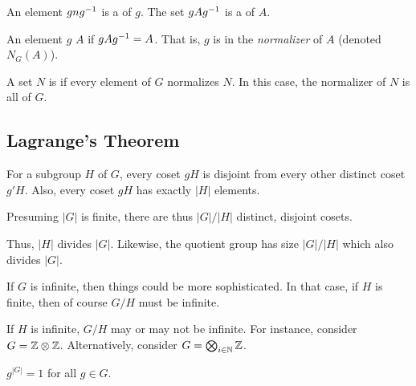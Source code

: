 \begin{definition}
  An element $gn{g}^{-1}$ is a  of $g$. The set
  $gA{g}^{-1}$ is a  of $A$.

  An element $g$  $A$ if $gA{g}^{-1} = A$. That is,
  $g$ is in the \emph{normalizer} of $A$ (denoted $N_G(A)$).

  A set $N$ is  if every element of $G$ normalizes $N$.
  In this case, the normalizer of $N$ is all of $G$.
\end{definition}

\begin{remark}

\end{remark}

\subsection{Lagrange's Theorem}

\begin{theorem}

  For a subgroup $H$ of $G$, every coset $gH$ is disjoint
  from every other distinct coset $g'H$. Also, every coset $gH$ has
  exactly $|H|$ elements.

  Presuming $|G|$ is finite, there are thus $|G|/|H|$ distinct, disjoint
  cosets.

  Thus, $|H|$ divides $|G|$. Likewise, the quotient group has size
  $|G|/|H|$ which also divides $|G|$.
\end{theorem}

\begin{remark}
  If $G$ is infinite, then things could be more sophisticated. In that
  case, if $H$ is finite, then of course $G/H$ must be infinite.

  If $H$ is infinite, $G/H$ may or may not be infinite. For instance,
  consider $G = \mathbb{Z} \otimes \mathbb{Z}$. Alternatively, consider $G =
  \bigotimes_{i \in \mathbb{N}} \mathbb{Z}$.
\end{remark}

\begin{corollary}

  $g^{|G|} = 1$ for all $g \in G$.
\end{corollary}

